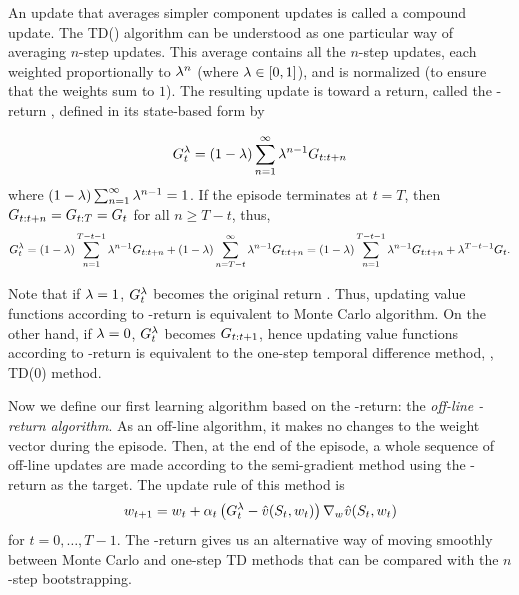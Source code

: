 An update that averages simpler component updates is called a compound update.
The TD(\tdparam) algorithm can be understood as one particular way of averaging $n$-step updates.
This average contains all the $n$-step updates,
each weighted proportionally to $\lambda^n$ (where $\lambda\in[0,1]$),
and is normalized (to ensure that the weights sum to $1$).
The resulting update is toward a return, called the \tdparam-return , defined in its state-based form by

\begin{equation}
\label{eq:lambda-return}
G^{\lambda}_{t} = (1-\lambda) \sum_{n=1}^\infty \lambda^{n-1} G_{{t}:{t+n}}
\end{equation}
where $(1-\lambda) \sum_{n=1}^\infty \lambda^{n-1} = 1$.
If the episode terminates at $t=T$,
then $G_{{t}:{t+n}} = G_{{t}:{T}} = G_{{t}}$ for all $n \geq T-t$,
thus,
\begin{equation}
G^{\lambda}_{t} = (1-\lambda) \sum_{n=1}^{T-t-1} \lambda^{n-1} G_{{t}:{t+n}}
+ (1-\lambda) \sum_{n=T-t}^\infty \lambda^{n-1} G_{{t}:{t+n}}
= (1-\lambda) \sum_{n=1}^{T-t-1} \lambda^{n-1} G_{{t}:{t+n}}
+ \lambda^{T-t-1} G_{{t}}.
\end{equation}

Note that if $\lambda=1$, $G^{\lambda}_{t}$ becomes the original return .
Thus, updating value functions according to \tdparam-return is equivalent to Monte Carlo algorithm.
On the other hand, if $\lambda=0$,
$G^{\lambda}_{t}$ becomes $G_{{t}:{t+1}}$,
hence updating value functions according to \tdparam-return is equivalent to
the one-step temporal difference method,
\ie, TD($0$) method.

Now we define our first learning algorithm based on the \tdparam-return:
the \emph{off-line \tdparam-return algorithm}.
As an off-line algorithm,
it makes no changes to the weight vector during the episode.
Then, at the end of the episode,
a whole sequence of off-line updates are made according
to the semi-gradient method
using the \tdparam-return as the target.
The update rule of this method is
\begin{equation}
\label{eq:off-line-lambda-return-update}
{w_{t+1}} = {w_{t}}
+ \alpha_{t} \left( G^{\lambda}_{t} - \hat{v}(S_{t}, {w_{t}})
\right) \nabla_{{w_{}}} \hat{v}(S_{t}, {w_{t}})
\end{equation}
for $t=0,\ldots, T-1$.
The \tdparam-return gives us
an alternative way of moving smoothly
between Monte Carlo and one-step TD methods
that can be compared with the $n$-step bootstrapping.

